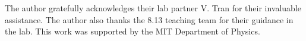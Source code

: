 \vfill\null

\begin{acknowledgments} The author gratefully acknowledges their lab partner V. Tran for their invaluable assistance. The author also thanks the 8.13 teaching team for their guidance in the lab. This work was supported by the MIT Department of Physics. 
\end{acknowledgments}





